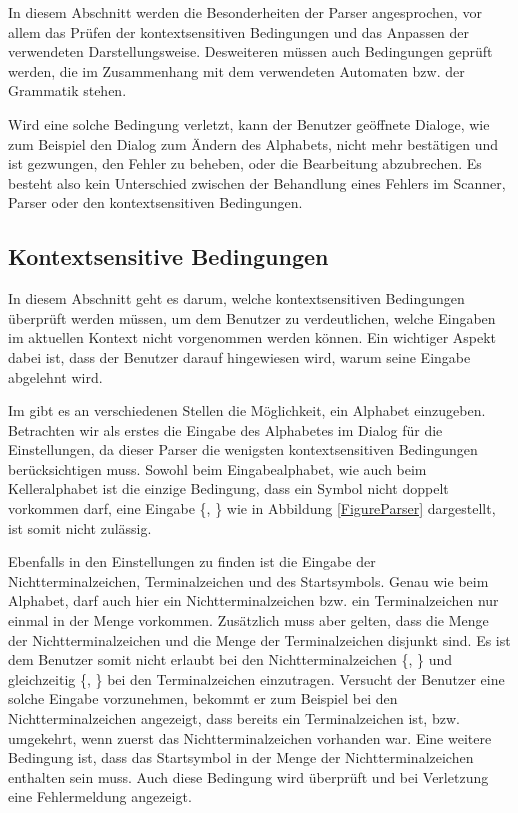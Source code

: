 In diesem Abschnitt werden die Besonderheiten der Parser angesprochen, vor allem
das Prüfen der kontextsensitiven Bedingungen und das Anpassen der verwendeten
Darstellungsweise. Desweiteren müssen auch Bedingungen geprüft werden, die im
Zusammenhang mit dem verwendeten Automaten bzw. der Grammatik
stehen.\vspace{10pt}

Wird eine solche Bedingung verletzt, kann der Benutzer geöffnete Dialoge, wie zum
Beispiel den Dialog zum Ändern des Alphabets, nicht mehr bestätigen und ist
gezwungen, den Fehler zu beheben, oder die Bearbeitung abzubrechen. Es besteht
also kein Unterschied zwischen der Behandlung eines Fehlers im Scanner, Parser
oder den kontextsensitiven Bedingungen.\vspace{10pt}


\subsection{Kontextsensitive Bedingungen}\label{ParserContext}

In diesem Abschnitt geht es darum, welche kontextsensitiven Bedingungen
über\-prüft werden müssen, um dem Benutzer zu verdeutlichen, welche Eingaben im
aktuellen Kontext nicht vorgenommen werden können. Ein wichtiger Aspekt dabei
ist, dass der Benutzer darauf hingewiesen wird, warum seine Eingabe abgelehnt
wird.\vspace{10pt}

Im \gtitool gibt es an verschiedenen Stellen die Möglichkeit, ein Alphabet
einzugeben. Betrachten wir als erstes die Eingabe des Alphabetes im Dialog für
die Einstellungen, da dieser Parser die wenigsten kontextsensitiven Bedingungen
berücksichtigen muss. Sowohl beim Eingabealphabet, wie auch beim Kelleralphabet
ist die einzige Bedingung, dass ein Symbol nicht doppelt vorkommen darf, eine
Eingabe \{, \} wie in Abbildung \ref{FigureParser}
dargestellt, ist somit nicht zulässig.\vspace{10pt}

Ebenfalls in den Einstellungen zu finden ist die Eingabe der
Nichtterminalzeichen, Terminalzeichen und des Startsymbols. Genau wie beim
Alphabet, darf auch hier ein Nichtterminalzeichen bzw. ein Terminalzeichen nur
einmal in der Menge vorkommen. Zusätzlich muss aber gelten, dass die Menge der
Nichtterminalzeichen  und die Menge der Terminalzeichen disjunkt sind. Es
ist dem Benutzer somit nicht erlaubt bei den Nichtterminalzeichen
\{, \} und gleichzeitig
\{, \} bei den Terminalzeichen einzutragen.
Versucht der Benutzer eine solche Eingabe vorzunehmen, bekommt er zum Beispiel
bei den Nichtterminalzeichen angezeigt, dass  bereits ein
Terminalzeichen ist, bzw. umgekehrt, wenn zuerst das Nichtterminalzeichen
vorhanden war. Eine weitere Bedingung ist, dass das Startsymbol in der Menge der
Nichtterminalzeichen enthalten sein muss. Auch diese Bedingung wird überprüft
und bei Verletzung eine Fehlermeldung angezeigt.\vspace{10pt}

